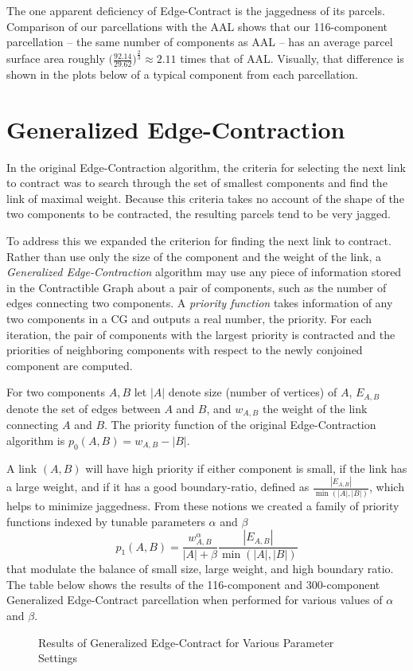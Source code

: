 The one apparent deficiency of Edge-Contract is the jaggedness of its
parcels. Comparison of our parcellations with the AAL shows that our
116-component parcellation -- the same number of components as AAL --
has an average parcel surface area roughly
$\big( \frac{92.14}{29.62} \big)^{\frac{2}{3} }\approx 2.11$ times
that of AAL. Visually, that difference is shown in the plots below of
a typical component from each parcellation.


\section{Generalized Edge-Contraction}

In the original Edge-Contraction algorithm, the criteria for selecting
the next link to contract was to search through the set of smallest
components and find the link of maximal weight. Because this criteria
takes no account of the shape of the two components to be contracted,
the resulting parcels tend to be very jagged.

To address this we expanded the criterion for finding the next link
to contract. Rather than use only the size of the component and the
weight of the link, a \textit{Generalized Edge-Contraction} algorithm
may use any piece of information stored in the Contractible Graph about
a pair of components, such as the number of edges connecting two
components. A \textit{priority function} takes information of any two
components in a CG and outputs a real number, the priority. For each
iteration, the pair of components with the largest priority is
contracted and the priorities of neighboring components with respect
to the newly conjoined component are computed.

For two components $A,B$ let $|A|$ denote size (number of vertices)
of $A$, $E_{A,B}$ denote the set of edges between $A$ and $B$, and
$w_{A,B}$ the weight of the link connecting $A$ and $B$.
The priority function of the original Edge-Contraction algorithm
is $p_0(A, B) = w_{A,B} - |B|$.

A link $(A, B)$ will have high priority if either component is small,
if the link has a large weight, and if it has a good boundary-ratio,
defined as $\frac{|E_{A,B}|}{\min(|A|,|B|)}$, which helps to minimize
jaggedness. From these notions we created a family of priority functions indexed by tunable parameters $\alpha$ and $\beta$
\[ p_1(A, B) = \frac{w_{A,B}^\alpha}{|A| + \beta}
               \frac{|E_{A,B}|}{\min(|A|,|B|)} \]
that modulate the balance of small size, large weight, and high
boundary ratio. The table below shows the results of the 116-component
and 300-component Generalized Edge-Contract parcellation when performed
for various values of $\alpha$ and $\beta$.

\begin{figure}
\caption{Results of Generalized Edge-Contract for Various Parameter Settings}
\end{figure}


